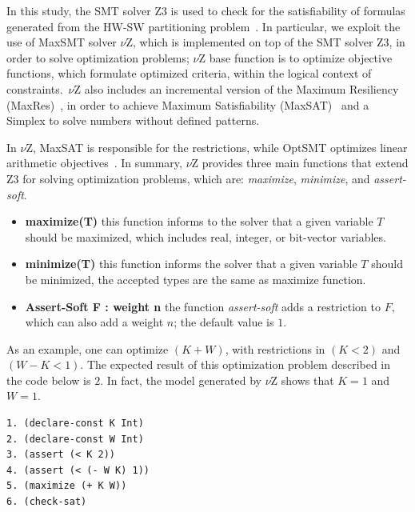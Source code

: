 In this study, the SMT solver Z3 is used to check for the satisfiability of formulas generated from the HW-SW partitioning problem~\cite{Bjorner2014}. In particular, we exploit the use of MaxSMT solver $\nu$Z, which is implemented on top of the SMT solver Z3, in order to solve optimization problems; $\nu$Z base function is to optimize objective functions, which formulate optimized criteria, within the logical context of constraints.~$\nu$Z also includes an incremental version of the Maximum Resiliency (MaxRes)~\cite{Federica2008}, in order to achieve Maximum Satisfiability (MaxSAT)~\cite{NarodytskaN} and a Simplex to solve numbers without defined patterns. 

In $\nu$Z, MaxSAT is responsible for the restrictions, while OptSMT optimizes linear arithmetic objectives~\cite{Bjorner2015}. In summary, $\nu$Z provides three main functions that extend Z3 for solving optimization problems, which are: \textit{maximize}, \textit{minimize}, and \textit{assert-soft}.

\begin{itemize}
\item{\textbf{maximize(T)}
this function informs to the solver that a given variable $T$ should be maximized, which includes real, integer, or bit-vector variables.}
\item{\textbf{minimize(T)}
this function informs the solver that a given variable $T$ should be minimized, the accepted types are the same as maximize function.}
\item{\textbf{Assert-Soft F : weight n}
the function \textit{assert-soft} adds a restriction to $F$, which can also add a weight $n$; the default value is $1$.}
\end{itemize}

As an example, one can optimize $\left(K + W\right)$, with restrictions in $\left(K < 2\right)$ and $\left(W - K < 1\right)$. The expected result of this optimization problem described in the code below is $2$. In fact, the model generated by $\nu$Z shows that $K = 1$ and $W = 1$.

\begin{lstlisting}[caption=Example of SMT formula using $\nu$Z, label=vZ]
1. (declare-const K Int) 
2. (declare-const W Int)
3. (assert (< K 2)) 
4. (assert (< (- W K) 1))
5. (maximize (+ K W)) 
6. (check-sat)
\end{lstlisting}

